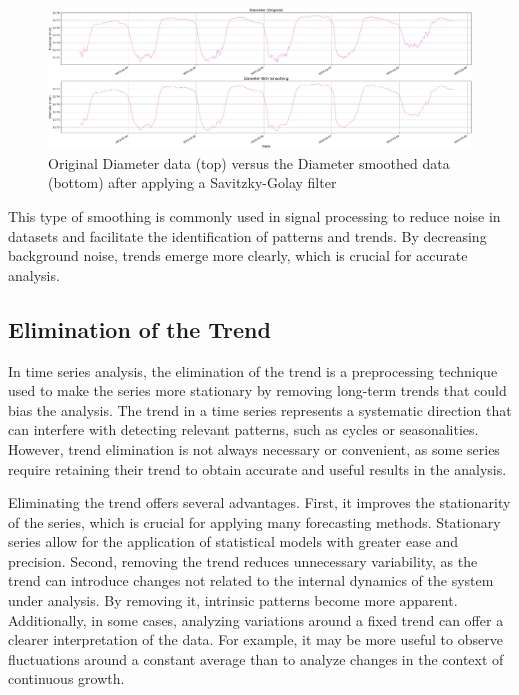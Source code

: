 \begin{figure}[htbp]
    \centering
    \includegraphics[width=15 cm]{5_ChapterDesign/figuras/2_Smoothing/Smoothing_Diameter}
    \caption{Original Diameter data (top) versus the Diameter smoothed data (bottom) after applying a Savitzky-Golay filter}
    \label{Smoothing_Diameter}
\end{figure}

This type of smoothing is commonly used in signal processing to reduce noise in datasets and facilitate the identification of patterns and trends. By decreasing background noise, trends emerge more clearly, which is crucial for accurate analysis.

\subsection{Elimination of the Trend}

In time series analysis, the elimination of the trend is a preprocessing technique used to make the series more stationary by removing long-term trends that could bias the analysis. The trend in a time series represents a systematic direction that can interfere with detecting relevant patterns, such as cycles or seasonalities. However, trend elimination is not always necessary or convenient, as some series require retaining their trend to obtain accurate and useful results in the analysis.

Eliminating the trend offers several advantages. First, it improves the stationarity of the series, which is crucial for applying many forecasting methods. Stationary series allow for the application of statistical models with greater ease and precision. Second, removing the trend reduces unnecessary variability, as the trend can introduce changes not related to the internal dynamics of the system under analysis. By removing it, intrinsic patterns become more apparent. Additionally, in some cases, analyzing variations around a fixed trend can offer a clearer interpretation of the data. For example, it may be more useful to observe fluctuations around a constant average than to analyze changes in the context of continuous growth.

